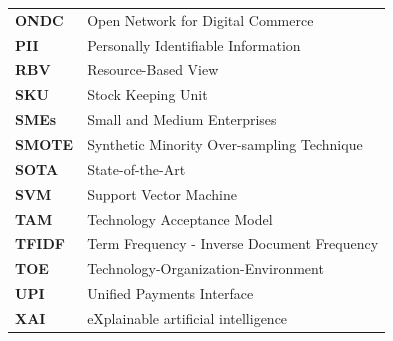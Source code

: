 \documentclass[authoryear,review,3p,times,12pt]{elsarticle}
\begin{document}
\begin{table}[htpb]
\begin{tabular}{ll}
\textbf{ONDC}     & Open Network for Digital Commerce                       \\
\textbf{PII}      & Personally Identifiable Information                     \\
\textbf{RBV}      & Resource-Based View                                     \\
\textbf{SKU}      & Stock Keeping Unit                                      \\
\textbf{SMEs}     & Small and Medium Enterprises                            \\
\textbf{SMOTE}    & Synthetic Minority Over-sampling Technique              \\
\textbf{SOTA}     & State-of-the-Art                                        \\
\textbf{SVM}      & Support Vector Machine                                  \\
\textbf{TAM}      & Technology Acceptance Model                             \\
\textbf{TFIDF}    & Term Frequency - Inverse Document Frequency             \\
\textbf{TOE}      & Technology-Organization-Environment                     \\
\textbf{UPI}      & Unified Payments Interface                              \\
\textbf{XAI}      & eXplainable artificial intelligence                    
\end{tabular}
\end{table}

\newpage
  
 
\end{document}
